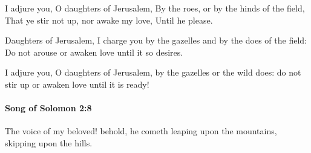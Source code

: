 			\begin{versebox}
					\item[BHS] 
					\item[LXX] 
					\item[ASV] I adjure you, O daughters of Jerusalem, By the roes, or by the hinds of the field, That ye stir not up, nor awake my love, Until he please.
					\item[NIV] Daughters of Jerusalem, I charge you by the gazelles and by the does of the field: Do not arouse or awaken love until it so desires.
					\item[NRSV] I adjure you, O daughters of Jerusalem, by the gazelles or the wild does: do not stir up or awaken love until it is ready!
			\end{versebox}

		\paragraph{Song of Solomon 2:8} %
			\label{SONGOFSOLOMON-2-8}

			The voice of my beloved! behold, he cometh leaping upon the mountains, skipping upon the hills.

